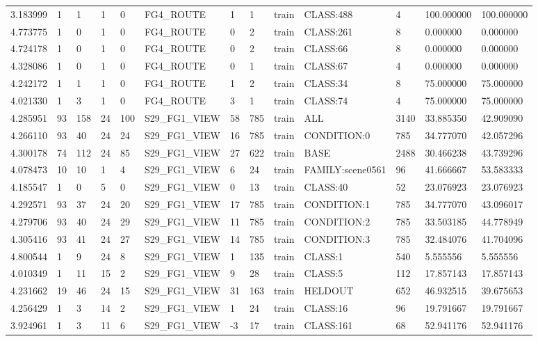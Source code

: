 \begin{tabular}{lllllllllllll}
3.183999 & 1 & 1 & 1 & 0 & FG4\_ROUTE & 1 & 1 & train & CLASS:488 & 4 & 100.000000 & 100.000000 \\
4.773775 & 1 & 0 & 1 & 0 & FG4\_ROUTE & 0 & 2 & train & CLASS:261 & 8 & 0.000000 & 0.000000 \\
4.724178 & 1 & 0 & 1 & 0 & FG4\_ROUTE & 0 & 2 & train & CLASS:66 & 8 & 0.000000 & 0.000000 \\
4.328086 & 1 & 0 & 1 & 0 & FG4\_ROUTE & 0 & 1 & train & CLASS:67 & 4 & 0.000000 & 0.000000 \\
4.242172 & 1 & 1 & 1 & 0 & FG4\_ROUTE & 1 & 2 & train & CLASS:34 & 8 & 75.000000 & 75.000000 \\
4.021330 & 1 & 3 & 1 & 0 & FG4\_ROUTE & 3 & 1 & train & CLASS:74 & 4 & 75.000000 & 75.000000 \\
4.285951 & 93 & 158 & 24 & 100 & S29\_FG1\_VIEW & 58 & 785 & train & ALL & 3140 & 33.885350 & 42.909090 \\
4.266110 & 93 & 40 & 24 & 24 & S29\_FG1\_VIEW & 16 & 785 & train & CONDITION:0 & 785 & 34.777070 & 42.057296 \\
4.300178 & 74 & 112 & 24 & 85 & S29\_FG1\_VIEW & 27 & 622 & train & BASE & 2488 & 30.466238 & 43.739296 \\
4.078473 & 10 & 10 & 1 & 4 & S29\_FG1\_VIEW & 6 & 24 & train & FAMILY:scene0561 & 96 & 41.666667 & 53.583333 \\
4.185547 & 1 & 0 & 5 & 0 & S29\_FG1\_VIEW & 0 & 13 & train & CLASS:40 & 52 & 23.076923 & 23.076923 \\
4.292571 & 93 & 37 & 24 & 20 & S29\_FG1\_VIEW & 17 & 785 & train & CONDITION:1 & 785 & 34.777070 & 43.096017 \\
4.279706 & 93 & 40 & 24 & 29 & S29\_FG1\_VIEW & 11 & 785 & train & CONDITION:2 & 785 & 33.503185 & 44.778949 \\
4.305416 & 93 & 41 & 24 & 27 & S29\_FG1\_VIEW & 14 & 785 & train & CONDITION:3 & 785 & 32.484076 & 41.704096 \\
4.800544 & 1 & 9 & 24 & 8 & S29\_FG1\_VIEW & 1 & 135 & train & CLASS:1 & 540 & 5.555556 & 5.555556 \\
4.010349 & 1 & 11 & 15 & 2 & S29\_FG1\_VIEW & 9 & 28 & train & CLASS:5 & 112 & 17.857143 & 17.857143 \\
4.231662 & 19 & 46 & 24 & 15 & S29\_FG1\_VIEW & 31 & 163 & train & HELDOUT & 652 & 46.932515 & 39.675653 \\
4.256429 & 1 & 3 & 14 & 2 & S29\_FG1\_VIEW & 1 & 24 & train & CLASS:16 & 96 & 19.791667 & 19.791667 \\
3.924961 & 1 & 3 & 11 & 6 & S29\_FG1\_VIEW & -3 & 17 & train & CLASS:161 & 68 & 52.941176 & 52.941176 \\

\end{tabular}

